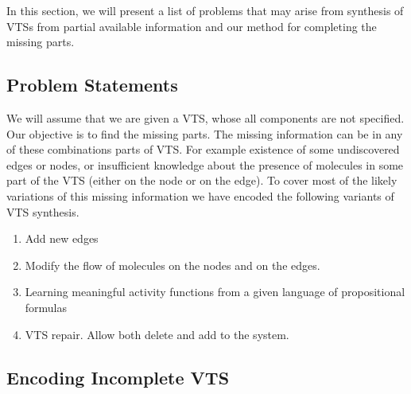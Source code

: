 In this section, we will present a list of problems that may arise from
synthesis of VTSs from partial available information
and our method for completing the missing parts.

\subsection{Problem Statements}

We will assume that we are given a VTS, whose all components
are not specified.
%
Our objective is to find the missing parts.
%
The missing information can be in any of these combinations parts of
VTS. For example existence of some undiscovered edges or nodes, or
insufficient knowledge about the presence of molecules in some part of
the VTS (either on the node or on the edge).
%
To cover most of the likely variations of this missing information we
have encoded the following variants of VTS synthesis.

\begin{enumerate}
\item  Add new edges 
\item  Modify the flow of molecules on the nodes and on the edges.
\item Learning meaningful activity functions from a given language of
  propositional formulas
\item  VTS repair. Allow both delete and add to the system.
\end{enumerate}


\subsection{Encoding Incomplete VTS}

